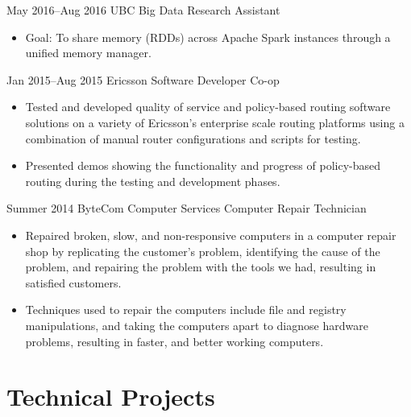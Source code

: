 \documentclass[]{friggeri-cv} %
\begin{document}
\begin{entrylist}

\entryFirstPage
{May 2016--Aug 2016}
{UBC {\normalfont Big Data Research Assistant}}
{
\begin{itemize}
\item Goal: To share memory (RDDs) across Apache Spark instances through a
unified memory manager.\\
\end{itemize}
}
\entryFirstPage
{Jan 2015--Aug 2015}
{Ericsson {\normalfont Software Developer Co-op}}
{
\begin{itemize}
\item Tested and developed quality of service and policy-based routing software
solutions on a variety of Ericsson's enterprise scale routing platforms using a
combination of manual router configurations and scripts for testing.
\item Presented demos showing the functionality and progress of policy-based
routing during the testing and development phases.\\
\end{itemize}
}
\entryFirstPage
{Summer 2014}
{ByteCom Computer Services {\normalfont Computer Repair Technician}}
{
\begin{itemize}
\item Repaired broken, slow, and non-responsive computers in a computer repair
shop by replicating the customer’s problem, identifying the cause of the
problem, and repairing the problem with the tools we had, resulting in satisfied
customers.
\item Techniques used to repair the computers include file and registry
manipulations, and taking the computers apart to diagnose hardware problems,
resulting in faster, and better working computers.
\end{itemize}
}
\end{entrylist}

\section{Technical Projects}
\end{document}

